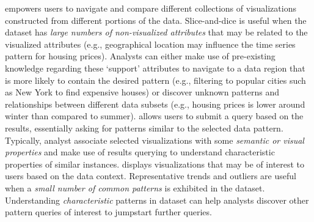 {     empowers users to navigate and compare different collections of visualizations constructed from different portions of the data. Slice-and-dice is useful when the dataset has \emph{large numbers of non-visualized attributes} that may be related to the visualized attributes (e.g., geographical location may influence the time series pattern for housing prices). Analysts can either make use of pre-existing knowledge regarding these `support' attributes to navigate to a data region that is more likely to contain the desired pattern (e.g., filtering to popular cities such as New York to find expensive houses) or discover unknown patterns and relationships between different data subsets (e.g., housing prices is lower around winter than compared to summer).%
     allows users to submit a query based on the results, essentially asking for patterns similar to the selected data pattern. Typically, analyst associate selected visualizations with some \emph{semantic or visual properties} and make use of results querying to understand characteristic properties of similar instances.
     displays visualizations that may be of interest to users based on the data context. Representative trends and outliers are useful when a \emph{small number of common patterns} is exhibited in the dataset. Understanding \emph{characteristic} patterns in dataset can help analysts discover other pattern queries of interest to jumpstart further queries.
}
